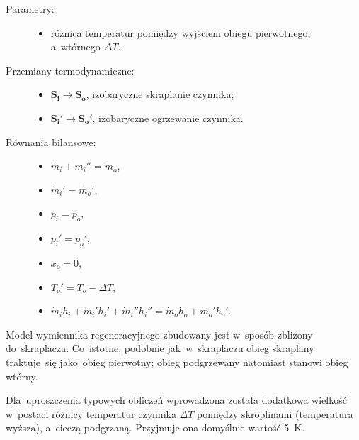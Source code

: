 \begin{description}

	\item[Parametry:] \hfill

		\begin{itemize}

			\item różnica temperatur pomiędzy wyjściem obiegu
				pierwotnego, a~wtórnego $\Delta T$.

		\end{itemize}

	\item[Przemiany termodynamiczne:] \hfill

		\begin{itemize}

			\item $\mathbf{S_i} \rightarrow \mathbf{S_o}$,
				izobaryczne skraplanie czynnika;

			\item $\mathbf{S_i'} \rightarrow \mathbf{S_o'}$,
				izobaryczne ogrzewanie czynnika.

		\end{itemize}

	\item[Równania bilansowe:] \hfill

		\begin{itemize}

			\item \eq$\dot m_i + m_i'' = \dot m_o$,

			\item \eq$\dot m_i' = \dot m_o'$,

			\item \eq$p_i = p_o$,

			\item \eq$p_i' = p_o'$,

			\item \eq$x_o = 0$,%
				\label{regen-x0}

			\item \eq$T_o' = T_o - \Delta T$,%
				\label{regen-DT}

			\item \eq$\dot m_i h_i + \dot m_i' h_i' + \dot m_i'' h_i''
				= \dot m_o h_o + \dot m_o' h_o'$.

		\end{itemize}

\end{description}

Model wymiennika regeneracyjnego zbudowany jest w~sposób zbliżony
do~skraplacza. Co~istotne, podobnie jak~w~skraplaczu obieg skraplany
traktuje~się jako~obieg pierwotny; obieg podgrzewany natomiast stanowi
obieg wtórny.

Dla~uproszczenia typowych obliczeń wprowadzona została dodatkowa
wielkość w~postaci różnicy temperatur czynnika $\Delta T$ pomiędzy
skroplinami (temperatura wyższa), a~cieczą podgrzaną. Przyjmuje ona
domyślnie wartość \SI{5}{\kelvin}.
